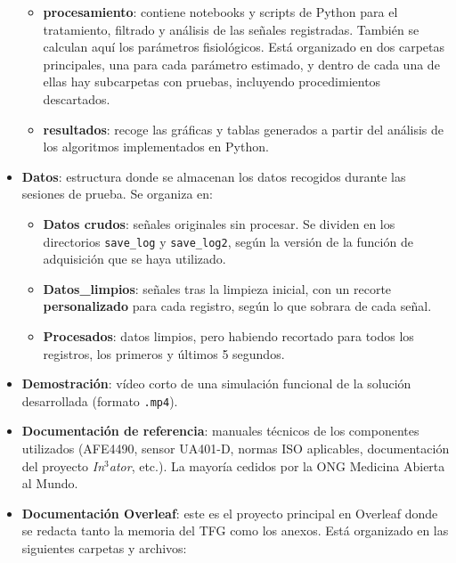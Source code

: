 \begin{itemize}
\begin{itemize}
    \item \textbf{procesamiento}: contiene notebooks y scripts de Python para el tratamiento, filtrado y análisis de las señales registradas. También se calculan aquí los parámetros fisiológicos. Está organizado en dos carpetas principales, una para cada parámetro estimado, y dentro de cada una de ellas hay subcarpetas con pruebas, incluyendo procedimientos descartados.

    \item \textbf{resultados}: recoge las gráficas y tablas generados a partir del análisis de los algoritmos implementados en Python.
\end{itemize}


    \item \textbf{Datos}: estructura donde se almacenan los datos recogidos durante las sesiones de prueba. Se organiza en:
    \begin{itemize}
        \item \textbf{Datos crudos}: señales originales sin procesar. Se dividen en los directorios \texttt{save\_log} y \texttt{save\_log2}, según la versión de la función de adquisición que se haya utilizado.
        \item \textbf{Datos\_limpios}: señales tras la limpieza inicial, con un recorte \textbf{personalizado} para cada registro, según lo que sobrara de cada señal.
        \item \textbf{Procesados}: datos limpios, pero habiendo recortado para todos los registros, los primeros y últimos 5 segundos.
    \end{itemize}

    \item \textbf{Demostración}: vídeo corto de una simulación funcional de la solución desarrollada (formato \texttt{.mp4}).

    \item \textbf{Documentación de referencia}: manuales técnicos de los componentes utilizados (AFE4490, sensor UA401-D, normas ISO aplicables, documentación del proyecto \textit{In$^3$ator}, etc.). La mayoría cedidos por la ONG Medicina Abierta al Mundo.

    \item \textbf{Documentación Overleaf}: este es el proyecto principal en Overleaf donde se redacta tanto la memoria del TFG como los anexos. Está organizado en las siguientes carpetas y archivos:


\end{itemize}
